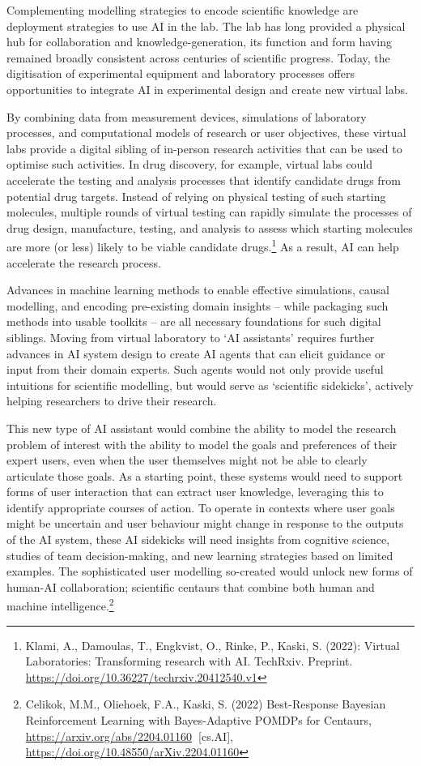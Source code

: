 Complementing modelling strategies to encode scientific knowledge are
deployment strategies to use AI in the lab. The lab has long provided a
physical hub for collaboration and knowledge-generation, its function
and form having remained broadly consistent across centuries of
scientific progress. Today, the digitisation of experimental equipment
and laboratory processes offers opportunities to integrate AI in
experimental design and create new virtual labs.

By combining data from measurement devices, simulations of laboratory
processes, and computational models of research or user objectives,
these virtual labs provide a digital sibling of in-person research
activities that can be used to optimise such activities. In drug
discovery, for example, virtual labs could accelerate the testing and
analysis processes that identify candidate drugs from potential drug
targets. Instead of relying on physical testing of such starting
molecules, multiple rounds of virtual testing can rapidly simulate the
processes of drug design, manufacture, testing, and analysis to assess
which starting molecules are more (or less) likely to be viable
candidate drugs.\footnote{Klami, A., Damoulas, T., Engkvist, O., Rinke,
  P., Kaski, S. (2022): Virtual Laboratories: Transforming research with
  AI. TechRxiv. Preprint.
  \url{https://doi.org/10.36227/techrxiv.20412540.v1}}
As a result, AI can help accelerate the research process.

Advances in machine learning methods to enable effective simulations,
causal modelling, and encoding pre-existing domain insights -- while
packaging such methods into usable toolkits -- are all necessary
foundations for such digital siblings. Moving from virtual laboratory to
`AI assistants' requires further advances in AI system design to create
AI agents that can elicit guidance or input from their domain experts.
Such agents would not only provide useful intuitions for scientific
modelling, but would serve as `scientific sidekicks', actively helping
researchers to drive their research.

This new type of AI assistant would combine the ability to model the
research problem of interest with the ability to model the goals and
preferences of their expert users, even when the user themselves might
not be able to clearly articulate those goals. As a starting point,
these systems would need to support forms of user interaction that can
extract user knowledge, leveraging this to identify appropriate courses
of action. To operate in contexts where user goals might be uncertain
and user behaviour might change in response to the outputs of the AI
system, these AI sidekicks will need insights from cognitive science,
studies of team decision-making, and new learning strategies based on
limited examples. The sophisticated user modelling so-created would
unlock new forms of human-AI collaboration; scientific centaurs that
combine both human and machine intelligence.\footnote{Celikok, M.M.,
  Oliehoek, F.A., Kaski, S. (2022) Best-Response Bayesian Reinforcement
  Learning with Bayes-Adaptive POMDPs for Centaurs,
  \url{https://arxiv.org/abs/2204.01160}\textbf{~}{[}cs.AI{]},
  \url{https://doi.org/10.48550/arXiv.2204.01160}}

